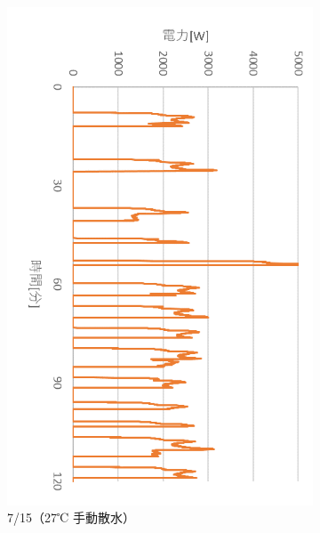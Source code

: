 \documentclass[a4j,fleqn,dvipdfmx,uplatex]{jsarticle}
\begin{document}
\begin{figure}[htb]
\begin{subfigure}[b]{0.42\linewidth}
    \includegraphics[width=\linewidth]{img/0715_power.png}
    \caption{7/15（27℃ 手動散水）}
  \end{subfigure}\\
  \begin{subfigure}[b]{0.42\linewidth}
    \centering

\end{subfigure}
\end{figure}
\end{document}
